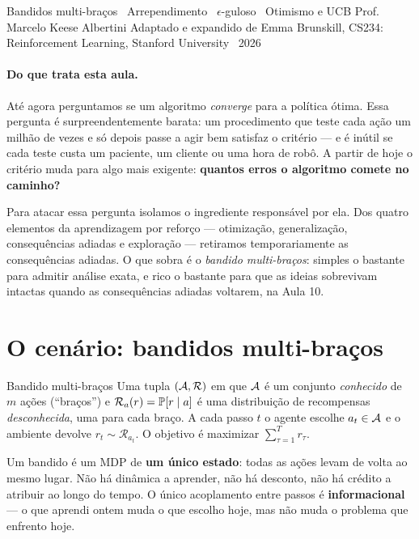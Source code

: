 \documentclass[11pt, a4paper]{article}
\begin{document}
     {Bandidos multi-braços \textbullet\ Arrependimento \textbullet\ $\epsilon$-guloso \textbullet\ Otimismo e UCB}
     {Prof. Marcelo Keese Albertini}
     {Adaptado e expandido de Emma Brunskill, CS234: Reinforcement Learning, Stanford University \textbullet\ 2026}

\paragraph{Do que trata esta aula.} Até agora perguntamos se um algoritmo
\emph{converge} para a política ótima. Essa pergunta é surpreendentemente
barata: um procedimento que teste cada ação um milhão de vezes e só depois
passe a agir bem satisfaz o critério — e é inútil se cada teste custa um
paciente, um cliente ou uma hora de robô. A partir de hoje o critério muda
para algo mais exigente: \textbf{quantos erros o algoritmo comete no
caminho?}

Para atacar essa pergunta isolamos o ingrediente responsável por ela. Dos
quatro elementos da aprendizagem por reforço — otimização, generalização,
consequências adiadas e exploração — retiramos temporariamente as
consequências adiadas. O que sobra é o \emph{bandido multi-braços}: simples
o bastante para admitir análise exata, e rico o bastante para que as ideias
sobrevivam intactas quando as consequências adiadas voltarem, na Aula 10.

\section{O cenário: bandidos multi-braços}

\begin{defbox}{Bandido multi-braços}
Uma tupla $(\mathcal{A}, \mathcal{R})$ em que $\mathcal{A}$ é um conjunto \emph{conhecido}
de $m$ ações (``braços'') e $\mathcal{R}_a(r) = \mathbb{P}[r \mid a]$ é uma
distribuição de recompensas \emph{desconhecida}, uma para cada braço. A cada
passo $t$ o agente escolhe $a_t \in \mathcal{A}$ e o ambiente devolve
$r_t \sim \mathcal{R}_{a_t}$. O objetivo é maximizar
$\sum_{\tau=1}^{T} r_\tau$.
\end{defbox}

Um bandido é um MDP de \textbf{um único estado}: todas as ações levam de
volta ao mesmo lugar. Não há dinâmica a aprender, não há desconto, não há
crédito a atribuir ao longo do tempo. O único acoplamento entre passos é
\textbf{informacional} — o que aprendi ontem muda o que escolho hoje, mas
não muda o problema que enfrento hoje.
\end{document}
